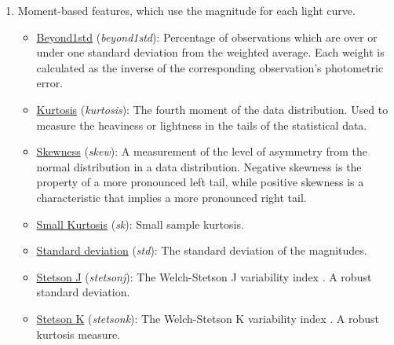 \documentclass[a4paper,fleqn,usenatbib]{mnras}
\begin{document}
\begin{enumerate}
    
\item Moment-based features, which use the magnitude for each light curve.
  \begin{itemize}
  \item \underline{Beyond1std} (\textit{beyond1std}): 
    Percentage of observations which are over or under one standard
    deviation from the weighted average. Each weight is calculated as
    the inverse of the corresponding observation's photometric error. 
        \item \underline{Kurtosis} (\textit{kurtosis}): 
        The fourth moment of the data distribution. Used to measure
        the heaviness or lightness in the tails of the statistical
        data. 
        \item \underline{Skewness} (\textit{skew}): 
        A measurement of the level of asymmetry from the normal
        distribution in a data distribution. Negative skewness is the
        property of a more pronounced left tail, while positive
        skewness is a characteristic that implies a more pronounced
        right tail. 
        \item \underline{Small Kurtosis} (\textit{sk}):
        Small sample kurtosis.
        \item \underline{Standard deviation} (\textit{std}):
        The standard deviation of the magnitudes.
        \item \underline{Stetson J} (\textit{stetson\textunderscore j}):
        The Welch-Stetson J variability index
        \cite{1996PASP..108..851S}. A robust standard deviation. 
        \item \underline{Stetson K} (\textit{stetson\textunderscore k}): 
        The Welch-Stetson K variability index
        \cite{1996PASP..108..851S}. A robust kurtosis measure. 
    \end{itemize}
    

\end{enumerate}
\end{document}
